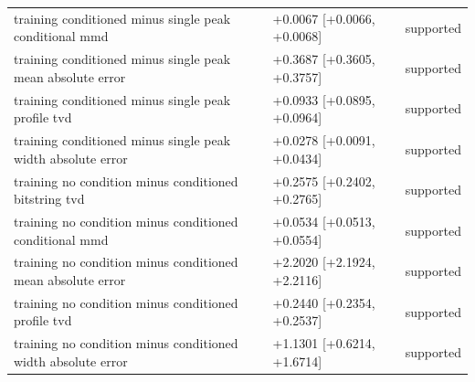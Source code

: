 \begin{table}[p]
\begin{tabular}{@{}p{}p{}p{}@{}}
training conditioned minus single peak conditional mmd & +0.0067 [+0.0066, +0.0068] & supported \\
training conditioned minus single peak mean absolute error & +0.3687 [+0.3605, +0.3757] & supported \\
training conditioned minus single peak profile tvd & +0.0933 [+0.0895, +0.0964] & supported \\
training conditioned minus single peak width absolute error & +0.0278 [+0.0091, +0.0434] & supported \\
training no condition minus conditioned bitstring tvd & +0.2575 [+0.2402, +0.2765] & supported \\
training no condition minus conditioned conditional mmd & +0.0534 [+0.0513, +0.0554] & supported \\
training no condition minus conditioned mean absolute error & +2.2020 [+2.1924, +2.2116] & supported \\
training no condition minus conditioned profile tvd & +0.2440 [+0.2354, +0.2537] & supported \\
training no condition minus conditioned width absolute error & +1.1301 [+0.6214, +1.6714] & supported \\
\bottomrule
\end{tabular}
\end{table}
\clearpage
